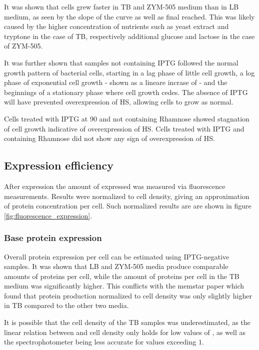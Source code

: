 It was shown that cells grew faster in TB and ZYM-505 medium than in LB medium,
as seen by the slope of the curve as well as final \odbact reached. This was
likely caused by the higher concentration of nutrients such as yeast extract
and tryptone in the case of TB, respectively additional glucose and lactose in
the case of ZYM-505.

It was further shown that samples not containing IPTG followed the normal
growth pattern of bacterial cells, starting in a lag phase of little cell
growth, a log phase of exponential cell growth - shown as a lineare incrase of
\odbact - and the beginnings of a stationary phase where cell growth cedes. The
absence of IPTG will have prevented overexpression of HS, allowing cells to
grow as normal.

Cells treated with IPTG at \SI{90}{\min} and not containing Rhamnose showed
stagnation of cell growth indicative of overexpression of HS. Cells treated
with IPTG and containing Rhamnose did not show any sign of overexpression of
HS.

\subsection{Expression efficiency}

After expression the amount of expressed \hsdsred{} was measured via fluorescence
measurements. Results were normalized to cell density, giving an approximation
of protein concentration per cell. Such normalized results are are shown in
figure \ref{fig:fluorescence_expression}.

\subsubsection{Base protein expression}

Overall protein expression per cell can be estimated using IPTG-negative
samples. It was shown that LB and ZYM-505 media produce comparable amounts of
proteins per cell, while the amount of proteins per cell in the TB medium was
significantly higher. This conflicts with the memstar paper which found that
protein production normalized to cell density was only slightly higher in TB
compared to the other two media. \cite{memstar}

It is possible that the cell density of the TB samples was underestimated, as
the linear relation between \odbact and cell density only holds for low values
of \odbact, as well as the spectrophotometer being less accurate for values
exceeding $1$.

